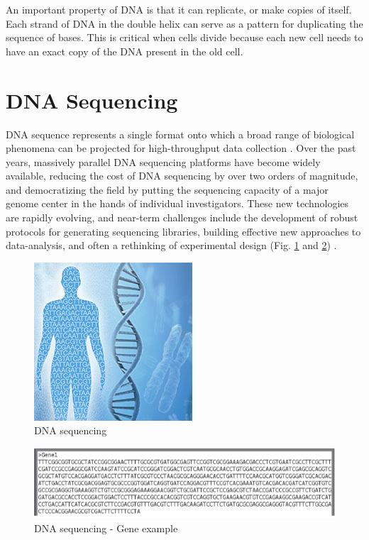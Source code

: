 \documentclass[12pt]{llncs}
\begin{document}
An important property of DNA is that it can replicate, or make copies of itself. Each strand of DNA in the double helix can serve as a pattern for duplicating the sequence of bases. This is critical when cells divide because each new cell needs to have an exact copy of the DNA present in the old cell.

\section{DNA Sequencing}
DNA sequence represents a single format onto which a broad range of biological phenomena can be projected for high-throughput data collection \cite{seq1}. 
Over the past years, massively parallel DNA sequencing platforms have become widely available, reducing the cost of DNA sequencing by over two orders of magnitude, and democratizing the field by putting the sequencing capacity of a major genome center in the hands of individual investigators. These new technologies are rapidly evolving, and near-term challenges include the development of robust protocols for generating sequencing libraries, building effective new approaches to data-analysis, and often a rethinking of experimental design (Fig. \ref{fig:fig-NGS-1} and \ref{fig:fig-NGS-2}) \cite{seq2,seq3}.
\begin{figure}
	\centering
	\includegraphics{./figs/NGS-1}
	\caption{\label{fig:fig-NGS-1}DNA sequencing}
\end{figure}

\begin{figure}
	\centering
	\includegraphics[width=.911\linewidth]{./figs/NGS-2}
	\caption{\label{fig:fig-NGS-2}DNA sequencing - Gene example}
\end{figure}
\end{document}
